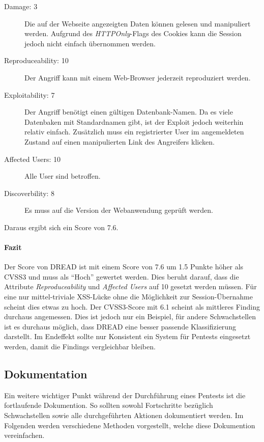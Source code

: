 	\begin{description}
		\item[Damage: 3] Die auf der Webseite angezeigten Daten können gelesen und manipuliert werden. Aufgrund des \textit{HTTPOnly}-Flags des Cookies kann die Session jedoch nicht einfach übernommen werden.
		\item[Reproduceability: 10] Der Angriff kann mit einem Web-Browser jederzeit reproduziert werden.
		\item[Exploitability: 7] Der Angriff benötigt einen gültigen Datenbank-Namen. Da es viele Datenbaken mit Standardnamen gibt, ist der Exploit jedoch weiterhin relativ einfach. Zusätzlich muss ein registrierter User im angemeldeten Zustand auf einen manipulierten Link des Angreifers klicken.
		\item[Affected Users: 10] Alle User sind betroffen.
		\item[Discoverbility: 8] Es muss auf die Version der Webanwendung geprüft werden.
	\end{description}
	
	Daraus ergibt sich ein Score von 7.6.
	
	\paragraph{Fazit}
	Der Score von DREAD ist mit einem Score von 7.6 um 1.5 Punkte höher als CVSS3 und muss als "`Hoch"' gewertet werden. Dies beruht darauf, dass die Attribute \textit{Reproduceability} und \textit{Affected Users} auf 10 gesetzt werden müssen. Für eine nur mittel-triviale XSS-Lücke ohne die Möglichkeit zur Session-Übernahme scheint dies etwas zu hoch. Der CVSS3-Score mit 6.1 scheint als mittleres Finding durchaus angemessen. Dies ist jedoch nur ein Beispiel, für andere Schwachstellen ist es durchaus möglich, dass DREAD eine besser passende Klassifizierung darstellt. Im Endeffekt sollte nur Konsistent ein System für Pentests eingesetzt werden, damit die Findings vergleichbar bleiben.
			
	\subsection{Dokumentation}
	Ein weitere wichtiger Punkt während der Durchführung eines Pentests ist die fortlaufende Dokumention. So sollten sowohl Fortschritte bezüglich Schwachstellen sowie alle durchgeführten Aktionen dokumentiert werden. Im Folgenden werden verschiedene Methoden vorgestellt, welche diese Dokumention vereinfachen.
	
